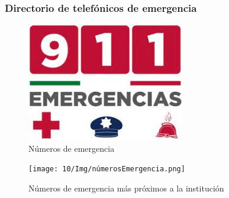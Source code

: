 \subsubsection{Directorio de telefónicos de emergencia}

\begin{figure}[H]
    \centering
    \includegraphics[scale=0.4]{10/Img/911.jpg}
    \caption{Números de emergencia }
    \label{fig:911.png}
\end{figure}

\begin{figure}[H]
    \centering
    \texttt{[image: 10/Img/númerosEmergencia.png]}
    \caption{Números de emergencia más próximos a la institución }
    \label{fig:númerosEmergencia.png}
\end{figure}
    
    
